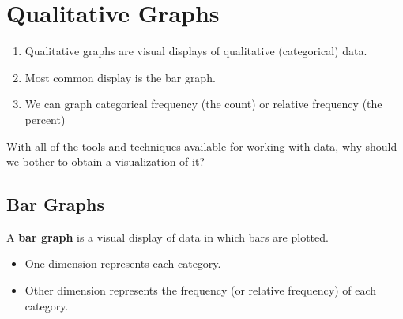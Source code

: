 \documentclass{article}
\begin{document}
\section*{Qualitative Graphs}

\begin{tcolorbox}[colframe=orange!70!white, coltitle=black, title=\textbf{Summary}]
\begin{enumerate}
    \item Qualitative graphs are visual displays of qualitative (categorical) data.
    \item Most common display is the bar graph.
    \item We can graph categorical frequency (the count) or relative frequency (the percent)
\end{enumerate}
\end{tcolorbox}
\vspace{0.75in}

With all of the tools and techniques available for working with data, why should we bother to obtain a visualization of it?	
\vspace{1in}

\subsection*{Bar Graphs}

\begin{tcolorbox}[colframe=green!20!black, colback = green!30!white,title=\textbf{Bar Graph}]
A \textbf{bar graph} is a visual display of data in which bars are plotted.
\begin{itemize}
    \item One dimension represents each category.
    \item Other dimension represents the frequency (or relative frequency) of each category.
\end{itemize}
\end{tcolorbox}
\vspace{1in}

\begin{center}
\end{center}
\end{document}
